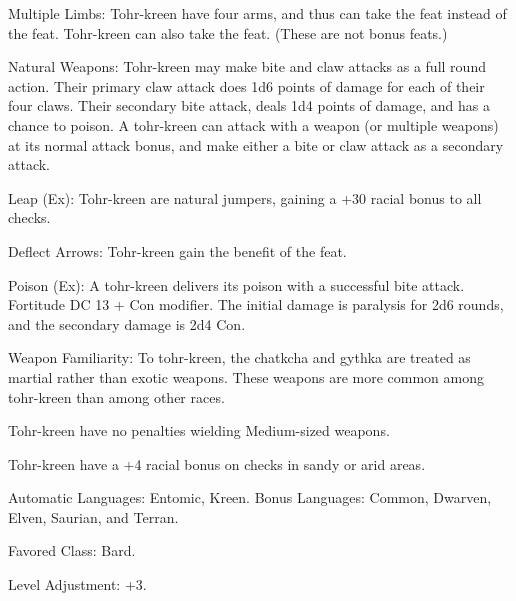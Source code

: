 \begin{itemize*}
    \item Multiple Limbs: Tohr-kreen have four arms, and thus can take the  feat instead of the  feat. Tohr-kreen can also take the  feat. (These are not bonus feats.)
    \item Natural Weapons: Tohr-kreen may make bite and claw attacks as a full round action. Their primary claw attack does 1d6 points of damage for each of their four claws. Their secondary bite attack, deals 1d4 points of damage, and has a chance to poison. A tohr-kreen can attack with a weapon (or multiple weapons) at its normal attack bonus, and make either a bite or claw attack as a secondary attack.
    \item Leap (Ex): Tohr-kreen are natural jumpers, gaining a +30 racial bonus to all  checks.
    \item Deflect Arrows: Tohr-kreen gain the benefit of the  feat.
    \item Poison (Ex): A tohr-kreen delivers its poison with a successful bite attack. Fortitude DC 13 + Con modifier. The initial damage is paralysis for 2d6 rounds, and the secondary damage is 2d4 Con.
    \item Weapon Familiarity: To tohr-kreen, the chatkcha and gythka are treated as martial rather than exotic weapons. These weapons are more common among tohr-kreen than among other races.
    \item Tohr-kreen have no penalties wielding Medium-sized weapons.
    \item Tohr-kreen have a +4 racial bonus on  checks in sandy or arid areas.
    \item Automatic Languages: Entomic, Kreen. Bonus Languages: Common, Dwarven, Elven, Saurian, and Terran.
    \item Favored Class: Bard.
    \item Level Adjustment: +3.
\end{itemize*}
